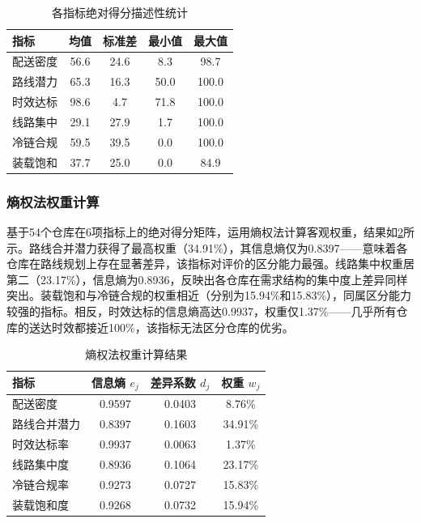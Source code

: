 \begin{table}[!h]
    \centering
    \begin{tabular}{lcccc}
        \toprule[1.5pt]
        指标 & 均值 & 标准差 & 最小值 & 最大值 \\
        \midrule[1pt]
        配送密度 & 56.6 & 24.6 & 8.3 & 98.7 \\
        路线潜力 & 65.3 & 16.3 & 50.0 & 100.0 \\
        时效达标 & 98.6 & 4.7 & 71.8 & 100.0 \\
        线路集中 & 29.1 & 27.9 & 1.7 & 100.0 \\
        冷链合规 & 59.5 & 39.5 & 0.0 & 100.0 \\
        装载饱和 & 37.7 & 25.0 & 0.0 & 84.9 \\
        \bottomrule[1.5pt]
    \end{tabular}\caption{各指标绝对得分描述性统计}
    \label{tab:desc}

\end{table}

\subsubsection{熵权法权重计算}

基于54个仓库在6项指标上的绝对得分矩阵，运用熵权法计算客观权重，结果如\cref{tab:entropy}所示。路线合并潜力获得了最高权重（34.91\%），其信息熵仅为0.8397——意味着各仓库在路线规划上存在显著差异，该指标对评价的区分能力最强。线路集中权重居第二（23.17\%），信息熵为0.8936，反映出各仓库在需求结构的集中度上差异同样突出。装载饱和与冷链合规的权重相近（分别为15.94\%和15.83\%），同属区分能力较强的指标。相反，时效达标的信息熵高达0.9937，权重仅1.37\%——几乎所有仓库的送达时效都接近100\%，该指标无法区分仓库的优劣。

\begin{table}[!h]
    \centering
    \begin{tabular}{lccc}
        \toprule[1.5pt]
        指标 & 信息熵 $e_j$ & 差异系数 $d_j$ & 权重 $w_j$ \\
        \midrule[1pt]
        配送密度 & 0.9597 & 0.0403 & 8.76\% \\
        路线合并潜力 & 0.8397 & 0.1603 & 34.91\% \\
        时效达标率 & 0.9937 & 0.0063 & 1.37\% \\
        线路集中度 & 0.8936 & 0.1064 & 23.17\% \\
        冷链合规率 & 0.9273 & 0.0727 & 15.83\% \\
        装载饱和度 & 0.9268 & 0.0732 & 15.94\% \\
        \bottomrule[1.5pt]
    \end{tabular}\caption{熵权法权重计算结果}
    \label{tab:entropy}

\end{table}

